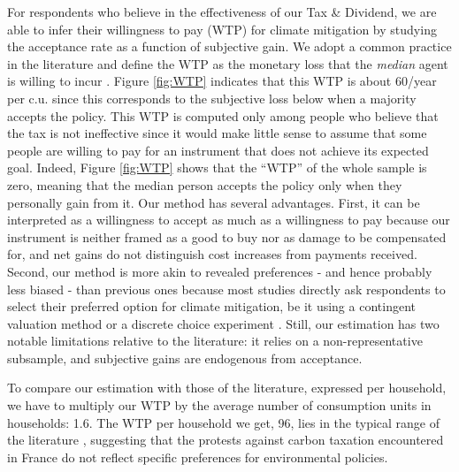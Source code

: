 \documentclass[12pt]{article} %
\begin{document}
\begin{appendices}
For respondents who believe in the effectiveness of our Tax \& Dividend, we are able to infer their willingness to pay (WTP) for climate mitigation by studying the acceptance rate as a function of subjective gain. We adopt a common practice in the literature and define the WTP as the monetary loss that the \textit{median} agent is willing to incur \citep{hanemann_welfare_1984}. Figure \ref{fig:WTP} indicates that this WTP is about 60\euros{}/year per c.u. since this corresponds to the subjective loss below when a majority accepts the policy. This WTP is computed only among people who believe that the tax is not ineffective since it would make little sense to assume that some people are willing to pay for an instrument that does not achieve its expected goal. Indeed, Figure \ref{fig:WTP} shows that the ``WTP'' of the whole sample is zero, meaning that the median person accepts the policy only when they personally gain from it. Our method has several advantages. First, it can be interpreted as a willingness to accept as much as a willingness to pay because our instrument is neither framed as a good to buy nor as damage to be compensated for, and net gains do not distinguish cost increases from payments received. Second, our method is more akin to revealed preferences - and hence probably less biased \citep{murphy_meta-analysis_2005} - than previous ones because most studies directly ask respondents to select their preferred option for climate mitigation, be it using a contingent valuation method \citep{berrens_information_2004,cameron_individual_2005,kotchen_willingness--pay_2013} or a discrete choice experiment \citep{longo_internalization_2008,alberini_preferences_2018}. Still, our estimation has two notable limitations relative to the literature: it relies on a non-representative subsample, and subjective gains are endogenous from acceptance. 



To compare our estimation with those of the literature, expressed per household, we have to multiply our WTP by the average number of consumption units in households: 1.6. The WTP per household we get, 96\euros{}, lies in the typical range of the literature \citep{jenkins_political_2014,streimikiene_review_2019}, suggesting that the protests against carbon taxation encountered in France do not reflect specific preferences for environmental policies.


\end{appendices}
\end{document}
